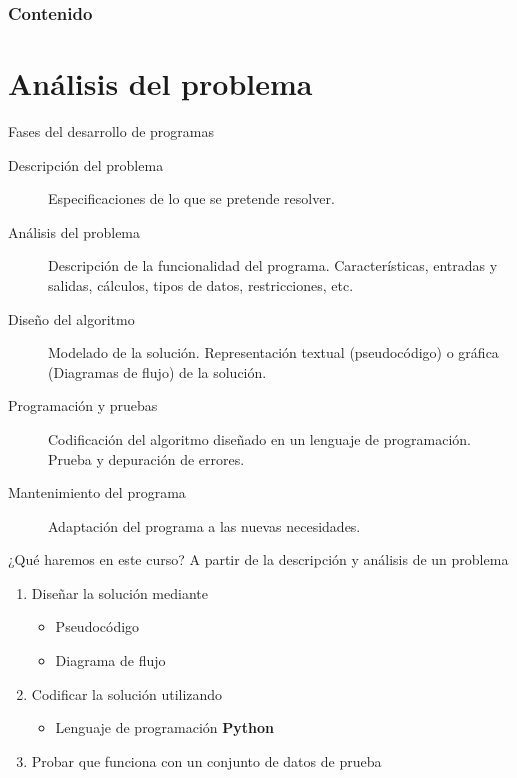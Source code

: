 \begin{frame}
    \frametitle{Contenido}
    \tableofcontents
\end{frame}

\section{Análisis del problema}

\begin{frame}[c]{Fases del desarrollo de programas}
  \begin{description}
    \item[Descripción del problema] Especificaciones de lo que se pretende
      resolver.
    \pausa
    \item[Análisis del problema] Descripción de la funcionalidad del programa.
      Características, entradas y salidas, cálculos, tipos de datos,
      restricciones, etc.
    \pausa
    \item[Diseño del algoritmo] Modelado de la solución. Representación
      textual (pseudocódigo) o gráfica (Diagramas de flujo) de la solución.
    \pausa
    \item[Programación y pruebas] Codificación del algoritmo diseñado en un
      lenguaje de programación. Prueba y depuración de errores.
    \pausa
    \item[Mantenimiento del programa] Adaptación del programa a las nuevas
      necesidades.
  \end{description}
\end{frame}

\begin{frame}[c]{¿Qué haremos en este curso?}
  A partir de la descripción y análisis de un problema
  \pausa
  \begin{enumerate}
    \item Diseñar la solución mediante
      \begin{itemize}
        \item Pseudocódigo
        \item Diagrama de flujo
      \end{itemize}
    \pausa
    \item Codificar la solución utilizando
      \begin{itemize}
        \item Lenguaje de programación \textbf{Python}
      \end{itemize}
    \pausa
    \item Probar que funciona con un conjunto de datos de prueba
  \end{enumerate}
\end{frame}

